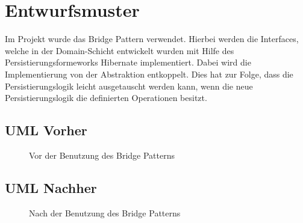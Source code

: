 \chapter{Entwurfsmuster}
Im Projekt wurde das Bridge Pattern verwendet. Hierbei werden die Interfaces, welche in der Domain-Schicht entwickelt wurden mit Hilfe des Persistierungsformeworks Hibernate implementiert. Dabei wird die Implementierung von der Abstraktion entkoppelt. Dies hat zur Folge, dass die Persistierungslogik leicht ausgetauscht werden kann, wenn die neue Persistierungslogik die definierten Operationen besitzt.

    \section{UML Vorher}
    \begin{figure}[h]
    	\centering
    	\caption{Vor der Benutzung des Bridge Patterns}
    	\label{before}
    \end{figure}
    
    \section{UML Nachher}
    \begin{figure}[h]
    	\centering
    	\caption{Nach der Benutzung des Bridge Patterns}
    	\label{before}
    \end{figure}